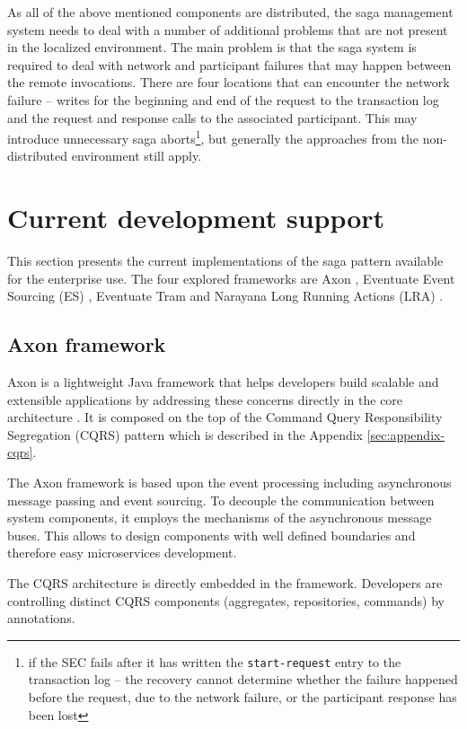 \documentclass[oneside,
  digital, %
  table,   %
  nolof,     %
  nolot,     %
]{fithesis3}
\begin{document}
As all of the above mentioned components are distributed, the saga management system needs to deal with a number of additional problems that are not present in the localized environment. The main problem is that the saga system is required to deal with network and participant failures that may happen between the remote invocations. There are four locations that can encounter the network failure -- writes for the beginning and end of the request to the transaction log and the request and response calls to the associated participant. This may introduce unnecessary saga aborts\footnote{if the SEC fails after it has written the \texttt{start-request} entry to the transaction log -- the recovery cannot determine whether the failure happened before the request, due to the network failure, or the participant response has been lost}, but generally the approaches from the non-distributed environment still apply.

\section{Current development support}

This section presents the current implementations of the saga pattern available for the enterprise use. The four explored frameworks are Axon \cite{axon_framework}, Eventuate Event Sourcing (ES) \cite{eventuate.io}, Eventuate Tram \cite{eventuate-tram} and Narayana Long Running Actions (LRA) \cite{narayana_lra}.

\subsection{Axon framework}

Axon is a lightweight Java framework that helps developers build scalable and extensible applications by addressing these concerns directly in the core architecture \cite{axon_framework}. It is composed on the top of the Command Query Responsibility Segregation (CQRS) pattern which is described in the Appendix \ref{sec:appendix-cqrs}.

The Axon framework is based upon the event processing including asynchronous message passing and event sourcing. To decouple the communication between system components, it employs the mechanisms of the asynchronous message buses. This allows to design components with well defined boundaries and therefore easy microservices development.

The CQRS architecture is directly embedded in the framework. Developers are controlling distinct CQRS components (aggregates, repositories, commands) by annotations. 
\end{document}
